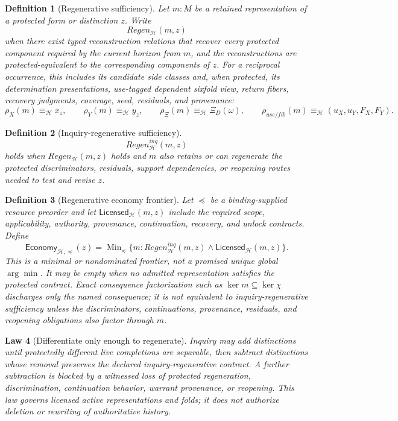 \documentclass[11pt,oneside]{article}
\newtheorem{definition}{Definition}[section]
\newtheorem{law}[definition]{Law}
\begin{document}
\begin{definition}[Regenerative sufficiency]
Let \(m:M\) be a retained representation of a protected form or distinction \(z\).  Write
\[
\boxed{
Regen_{\mathcal H}(m,z)
}
\]
when there exist typed reconstruction relations that recover every protected component required by the current horizon from \(m\), and the reconstructions are protected-equivalent to the corresponding components of \(z\).  For a reciprocal occurrence, this includes its candidate side classes and, when protected, its determination presentations, use-tagged dependent sixfold view, return fibers, recovery judgments, coverage, seed, residuals, and provenance:
\[
\rho_X(m)\equiv_{\mathcal H}x_z,
\qquad
\rho_Y(m)\equiv_{\mathcal H}y_z,
\qquad
\rho_{\Xi}(m)\equiv_{\mathcal H}\Xi_D(\omega),
\qquad
\rho_{use/fib}(m)\equiv_{\mathcal H}(u_X,u_Y,F_X,F_Y).
\]
\end{definition}

\begin{definition}[Inquiry-regenerative sufficiency]
\[
\boxed{
Regen^{inq}_{\mathcal H}(m,z)
}
\]
holds when \(Regen_{\mathcal H}(m,z)\) holds and \(m\) also retains or can regenerate the protected discriminators, residuals, support dependencies, or reopening routes needed to test and revise \(z\).
\end{definition}

\begin{definition}[Regenerative economy frontier]\label{def:regenerative-economy}
Let \(\preceq\) be a binding-supplied resource preorder and let
\(\mathsf{Licensed}_{\mathcal H}(m,z)\) include the required scope, applicability,
authority, provenance, continuation, recovery, and unlock contracts.  Define
\[
\boxed{
\mathsf{Economy}_{\mathcal H,\preceq}(z)
=
\operatorname{Min}_{\preceq}
\{
m:
Regen^{inq}_{\mathcal H}(m,z)
\land
\mathsf{Licensed}_{\mathcal H}(m,z)
\}.
}
\]
This is a minimal or nondominated frontier, not a promised unique global
\(\arg\min\).  It may be empty when no admitted representation satisfies the protected
contract.  Exact consequence factorization such as
\(\ker m\subseteq\ker\chi\) discharges only the named consequence; it is not equivalent
to inquiry-regenerative sufficiency unless the discriminators, continuations,
provenance, residuals, and reopening obligations also factor through \(m\).
\end{definition}

\begin{law}[Differentiate only enough to regenerate]\label{law:regenerative-economy}
Inquiry may add distinctions until protectedly different live completions are
separable, then subtract distinctions whose removal preserves the declared
inquiry-regenerative contract.  A further subtraction is blocked by a witnessed loss
of protected regeneration, discrimination, continuation behavior, warrant provenance,
or reopening.  This law governs licensed active representations and folds; it does not
authorize deletion or rewriting of authoritative history.
\end{law}
\end{document}
